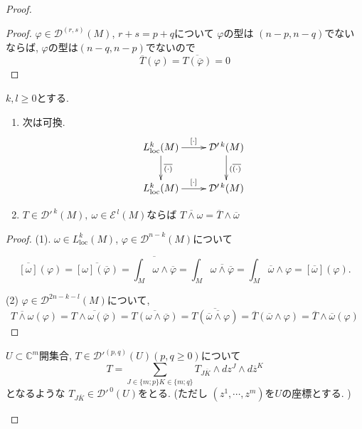 \begin{proof}
\begin{proof}
\( \varphi\in \mathcal{D}^{(r,s)}(M) \), \( r+s=p+q \)について
$\varphi$の型は \( (n-p,n-q) \)でないならば,  \( \varphi \)の型は\( (n-q,n-p) \)でないので
\[
\overline{T}(\varphi)=\overline{T(\overline{\varphi})}=0
\]
\end{proof}


\begin{tcolorbox}[mybox]
\begin{lem}
\label{lem-M-4.2.2}
 \( k,l\geq 0 \)とする. 

\begin{enumerate}
\item 次は可換.
\[
\xymatrix{
L^k_{\mathrm{loc}}(M) \ar[r]^{[\cdot]} \ar[d]^{\overline{(\cdot)}}
& \mathcal{D}'^{\,k}(M) \ar[d]^{(\overline{(\cdot)}}
\\
L^k_{\mathrm{loc}}(M) \ar[r]^{[\cdot]}
& \mathcal{D}'^{\,k}(M)
}
\]

\item  \( T\in \mathcal{D}'^{\,k}(M),\ \omega\in \mathcal{E}^{\,l}(M) \)ならば
\(\overline{T\wedge \omega}=\overline{T}\wedge \overline{\omega}
\)
\end{enumerate}
\end{lem}
\end{tcolorbox}
\begin{proof}
(1). \( \omega\in L^k_{\mathrm{loc}}(M) \), \( \varphi\in \mathcal{D}^{n-k}(M) \)について

\[
\overline{[\omega]}(\varphi)
=\overline{[\omega](\overline{\varphi})}
=\overline{\int_M \omega\wedge \overline{\varphi}}
=\int_M \overline{\omega\wedge \overline{\varphi}}
=\int_M \overline{\omega}\wedge \varphi
=[\overline{\omega}](\varphi).
\]

(2) \(  \varphi\in \mathcal{D}^{2n-k-l}(M) \)について, 
\[
\overline{T\wedge \omega}(\varphi)
=\overline{T\wedge \omega (\overline{\varphi})}
=\overline{T(\omega\wedge \overline{\varphi})}
=\overline{T(\overline{\overline{\omega}\wedge \varphi})}
=\overline{T}(\overline{\omega}\wedge \varphi)
=\overline{T}\wedge \overline{\omega}(\varphi)
\]
\end{proof}

\begin{tcolorbox}[mybox]
\begin{cor}
\label{cor-M-4.2.3}
 \( U\subset \mathbb{C}^m \)開集合,  \( T\in \mathcal{D}'^{(p,q)}(U) (p,q\geq 0) \)について
$$
 T=\sum_{J \in \{m ; p\} K \in \{m ; q\} } 
 T_{J\overline{K}} \wedge dz^J \wedge d\overline{z}^K 
 $$
 となるような
 \( T_{J\overline{K}}\in \mathcal{D}'^{\,0}(U)\)をとる. 
 (ただし \((z^1,\cdots,z^m)\)を$U$の座標とする. )


\end{cor}
\end{tcolorbox}
\end{proof}
